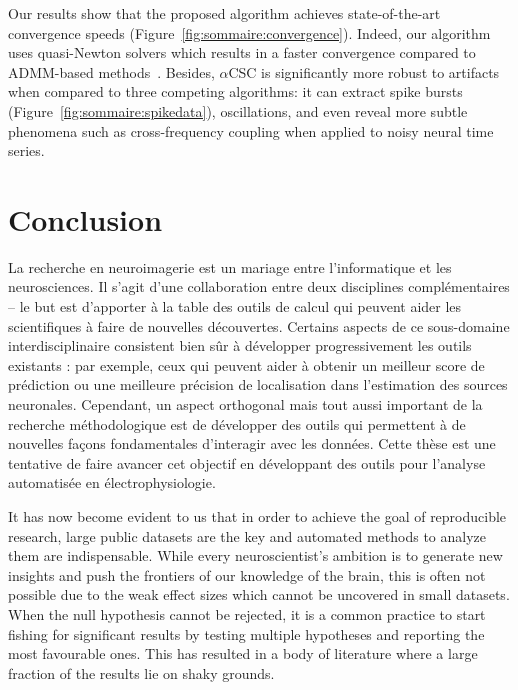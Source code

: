 Our results
show that the proposed algorithm achieves state-of-the-art convergence speeds (Figure~\ref{fig:sommaire:convergence}). Indeed, our algorithm uses quasi-Newton solvers which results in a faster convergence compared to ADMM-based methods~\citep{heide2015fast, wohlberg2016efficient}. Besides, $\alpha$CSC is
significantly more robust to artifacts when compared to three competing algorithms: it can extract
spike bursts (Figure~\ref{fig:sommaire:spikedata}), oscillations, and even reveal more subtle phenomena such as cross-frequency coupling
when applied to noisy neural time series.

\section*{Conclusion}

La recherche en neuroimagerie est un mariage entre l'informatique et les neurosciences. Il s'agit d'une collaboration entre deux disciplines complémentaires -- le but est d'apporter à la table des outils de calcul qui peuvent aider les scientifiques à faire de nouvelles découvertes. Certains aspects de ce sous-domaine interdisciplinaire consistent bien sûr à développer progressivement les outils existants : par exemple, ceux qui peuvent aider à obtenir un meilleur score de prédiction ou une meilleure précision de localisation dans l'estimation des sources neuronales. Cependant, un aspect orthogonal mais tout aussi important de la recherche méthodologique est de développer des outils qui permettent à de nouvelles façons fondamentales d'interagir avec les données. Cette thèse est une tentative de faire avancer cet objectif en développant des outils pour l'analyse automatisée en électrophysiologie.

It has now become evident to us that in order to achieve the goal of reproducible research, large public datasets are the key and automated methods to analyze them are indispensable. While every neuroscientist's ambition is to generate new insights and push the frontiers of our knowledge of the brain, this is often not possible due to the weak effect sizes which cannot be uncovered in small datasets. When the null hypothesis cannot be rejected, it is a common practice to start fishing for significant results by testing multiple hypotheses and reporting the most favourable ones. This has resulted in a body of literature where a large fraction of the results lie on shaky grounds. 

